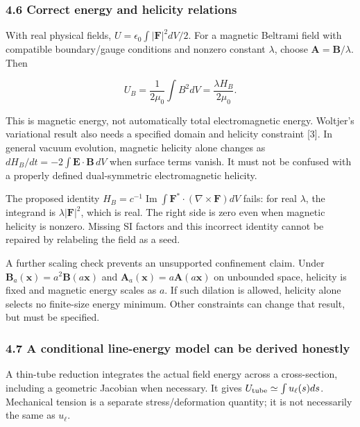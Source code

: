 \documentclass[
  11pt,
]{article}
\begin{document}
\hypertarget{correct-energy-and-helicity-relations}{%
\subsubsection{4.6 Correct energy and helicity
relations}\label{correct-energy-and-helicity-relations}}

With real physical fields, \(U=\epsilon_0\int|\mathbf F|^2dV/2\). For a
magnetic Beltrami field with compatible boundary/gauge conditions and
nonzero constant \(\lambda\), choose \(\mathbf A=\mathbf B/\lambda\).
Then

\[
U_B=\frac{1}{2\mu_0}\int B^2dV
=\frac{\lambda H_B}{2\mu_0}.
\]

This is magnetic energy, not automatically total electromagnetic energy.
Woltjer's variational result also needs a specified domain and helicity
constraint {[}3{]}. In general vacuum evolution, magnetic helicity alone
changes as \(dH_B/dt=-2\int\mathbf E\cdot\mathbf B\,dV\) when surface
terms vanish. It must not be confused with a properly defined
dual-symmetric electromagnetic helicity.

The proposed identity
\(H_B=c^{-1}\operatorname{Im}\int\mathbf F^*\cdot(\nabla\times\mathbf F)dV\)
fails: for real \(\lambda\), the integrand is \(\lambda|\mathbf F|^2\),
which is real. The right side is zero even when magnetic helicity is
nonzero. Missing SI factors and this incorrect identity cannot be
repaired by relabeling the field as a seed.

A further scaling check prevents an unsupported confinement claim. Under
\(\mathbf B_a(\mathbf x)=a^2\mathbf B(a\mathbf x)\) and
\(\mathbf A_a(\mathbf x)=a\mathbf A(a\mathbf x)\) on unbounded space,
helicity is fixed and magnetic energy scales as \(a\). If such dilation
is allowed, helicity alone selects no finite-size energy minimum. Other
constraints can change that result, but must be specified.

\hypertarget{a-conditional-line-energy-model-can-be-derived-honestly}{%
\subsubsection{4.7 A conditional line-energy model can be derived
honestly}\label{a-conditional-line-energy-model-can-be-derived-honestly}}

A thin-tube reduction integrates the actual field energy across a
cross-section, including a geometric Jacobian when necessary. It gives
\(U_{\rm tube}\simeq\int u_\ell(s)ds\). Mechanical tension is a separate
stress/deformation quantity; it is not necessarily the same as
\(u_\ell\).
\end{document}
